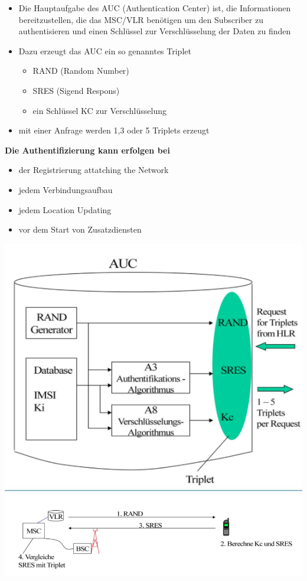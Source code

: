 \begin{minipage}{0.5 \linewidth}
\begin{itemize}
\item Die Hauptaufgabe des AUC (Authentication Center) ist, die Informationen bereitzustellen, die das MSC/VLR benötigen um den Subscriber zu authentisieren und einen Schlüssel zur Verschlüsselung der Daten zu finden
\item Dazu erzeugt das AUC ein so genanntes Triplet
\begin{itemize}
\item RAND (Random Number)
\item SRES (Sigend Respons)
\item ein Schlüssel KC zur Verschlüsselung 
\end{itemize}
\item mit einer Anfrage werden 1,3 oder 5 Triplets erzeugt
\end{itemize}
\vspace{0.5 cm}
\textbf{Die Authentifizierung kann erfolgen bei}
\begin{itemize}
\item der Registrierung {attatching the Network}
\item jedem Verbindungsaufbau
\item jedem Location Updating
\item vor dem Start von Zusatzdiensten
\end{itemize}
\end{minipage}
\begin{minipage}{0.5 \linewidth}
\includegraphics[width =  0.75 \linewidth]{./Pics/GSMAUC} 
\includegraphics[width =  \linewidth]{./Pics/GSMAuthentifizierung} 
\end{minipage}
